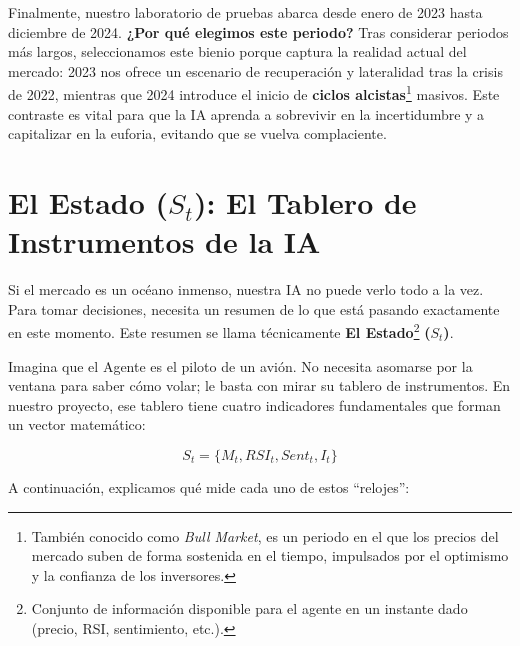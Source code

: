 \documentclass[12pt,a4paper]{article}
\begin{document}
Finalmente, nuestro laboratorio de pruebas abarca desde enero de 2023 hasta diciembre de 2024. \textbf{¿Por qué elegimos este periodo?} Tras considerar periodos más largos, seleccionamos este bienio porque captura la realidad actual del mercado: 2023 nos ofrece un escenario de recuperación y lateralidad tras la crisis de 2022, mientras que 2024 introduce el inicio de \textbf{ciclos alcistas}\footnote{También conocido como \textit{Bull Market}, es un periodo en el que los precios del mercado suben de forma sostenida en el tiempo, impulsados por el optimismo y la confianza de los inversores.} masivos. Este contraste es vital para que la IA aprenda a sobrevivir en la incertidumbre y a capitalizar en la euforia, evitando que se vuelva complaciente.

\section{El Estado ($S_t$): El Tablero de Instrumentos de la IA}

Si el mercado es un océano inmenso, nuestra IA no puede verlo todo a la vez. Para tomar decisiones, necesita un resumen de lo que está pasando exactamente en este momento. Este resumen se llama técnicamente \textbf{El Estado}\footnote{Conjunto de información disponible para el agente en un instante dado (precio, RSI, sentimiento, etc.).} \textbf{($S_t$)}.

Imagina que el Agente es el piloto de un avión. No necesita asomarse por la ventana para saber cómo volar; le basta con mirar su tablero de instrumentos. En nuestro proyecto, ese tablero tiene cuatro indicadores fundamentales que forman un vector matemático:

\begin{equation}
    S_t = \{M_t, RSI_t, Sent_t, I_t\}
\end{equation}

A continuación, explicamos qué mide cada uno de estos ``relojes'':
\end{document}
